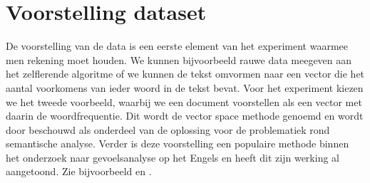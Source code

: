 \section{Voorstelling dataset}\label{Voorstelling dataset}
%
De voorstelling van de data is een eerste element van het experiment waarmee men rekening moet houden. We kunnen bijvoorbeeld rauwe data meegeven aan het zelflerende algoritme of we kunnen de tekst omvormen naar een vector die het aantal voorkomens van ieder woord in de tekst bevat. Voor het experiment kiezen we het tweede voorbeeld, waarbij we een document voorstellen als een vector met daarin de woordfrequentie. Dit wordt de vector space methode genoemd en wordt door \cite{turney2010frequency} beschouwd als onderdeel van de oplossing voor de problematiek rond semantische analyse. Verder is deze voorstelling een populaire methode binnen het onderzoek naar gevoelsanalyse op het Engels en heeft dit zijn werking al aangetoond. Zie bijvoorbeeld \cite{pang2002thumbs} en \cite{maas2011learnin}.

